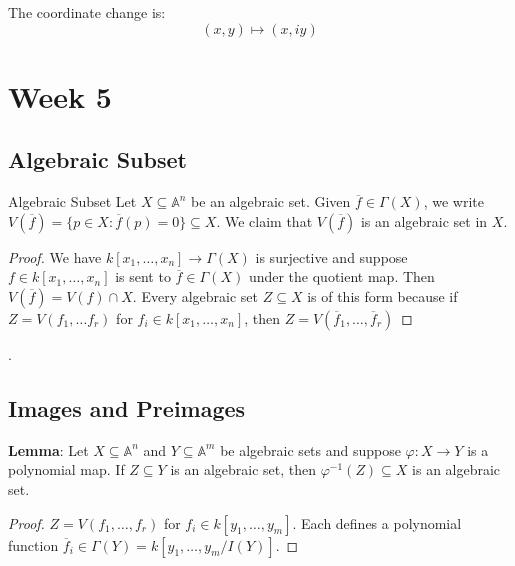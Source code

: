 \documentclass{report}
\begin{document}
The coordinate change is:
    \begin{equation*}
        (x, y) \mapsto (x, iy)
    \end{equation*}

\chapter{Week 5}

\begin{topic}
    \section{Algebraic Subset}
\end{topic}

\begin{definition}{Algebraic Subset}
    Let $X \subseteq \mathbb{A}^{n}$ be an algebraic set. Given $\overline{f} \in \Gamma(X)$, we write $V(\overline{f}) = \{p \in X : \overline{f}(p) = 0\} \subseteq X$. We claim that $V(\overline{f})$ is an algebraic set in $X$.
\end{definition}
    \begin{proof}
        We have $k[x_{1}, \ldots , x_{n}] \rightarrow \Gamma(X)$ is surjective and suppose $f \in k[x_{1}, \ldots , x_{n}]$ is sent to $\overline{f} \in \Gamma(X)$ under the quotient map. Then $V(\overline{f}) = V(f) \cap X$. Every algebraic set $Z \subseteq X$ is of this form because if $Z = V(f_{1}, \ldots  f_{r})$ for $f_{i} \in k[x_{1}, \ldots , x_{n}]$, then $Z = V(\overline{f}_{1}, \ldots , \overline{f}_{r})$
    \end{proof}.

\begin{topic}
    \section{Images and Preimages}
\end{topic}

\textbf{Lemma}: Let $X \subseteq \mathbb{A}^{n}$ and $Y \subseteq \mathbb{A}^{m}$ be algebraic sets and suppose $\varphi : X \rightarrow Y$ is a polynomial map. If $Z \subseteq Y$ is an algebraic set, then $\varphi^{-1}(Z) \subseteq X$ is an algebraic set.
    \begin{proof}
        $Z = V(f_{1}, \ldots , f_{r}) $ for $f_{i} \in k[y_{1}, \ldots , y_{m}]$. Each defines a polynomial function $\overline{f}_{i} \in \Gamma(Y) = k[y_{1}, \ldots , y_{m}/I(Y)]$. 
    \end{proof}
\end{document}
